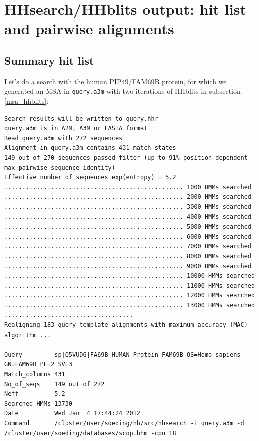 \documentclass[11pt,a4paper]{article}
\begin{document}
\section{HHsearch/HHblits output: hit list and pairwise alignments}\label{outformat}

\subsection{Summary hit list}

Let's do a search with the human PIP49/FAM69B protein, for which we generated an MSA in \verb`query.a3m` with two iterations of HHblits in subsection \ref{msa_hhblits}:

\scriptsize
\begin{verbatim}
Search results will be written to query.hhr
query.a3m is in A2M, A3M or FASTA format
Read query.a3m with 272 sequences
Alignment in query.a3m contains 431 match states
149 out of 270 sequences passed filter (up to 91% position-dependent max pairwise sequence identity)
Effective number of sequences exp(entropy) = 5.2 
.................................................. 1000 HMMs searched
.................................................. 2000 HMMs searched
.................................................. 3000 HMMs searched
.................................................. 4000 HMMs searched
.................................................. 5000 HMMs searched
.................................................. 6000 HMMs searched
.................................................. 7000 HMMs searched
.................................................. 8000 HMMs searched
.................................................. 9000 HMMs searched
.................................................. 10000 HMMs searched
.................................................. 11000 HMMs searched
.................................................. 12000 HMMs searched
.................................................. 13000 HMMs searched
....................................
Realigning 183 query-template alignments with maximum accuracy (MAC) algorithm ...

Query         sp|Q5VUD6|FA69B_HUMAN Protein FAM69B OS=Homo sapiens GN=FAM69B PE=2 SV=3
Match_columns 431
No_of_seqs    149 out of 272
Neff          5.2 
Searched_HMMs 13730
Date          Wed Jan  4 17:44:24 2012
Command       /cluster/user/soeding/hh/src/hhsearch -i query.a3m -d /cluster/user/soeding/databases/scop.hhm -cpu 18 


\end{verbatim}
\end{document}
